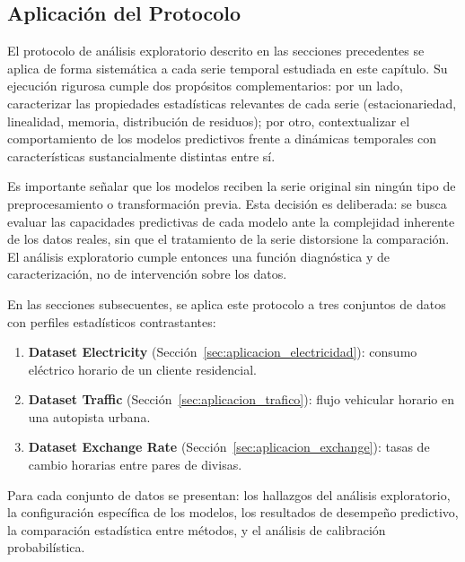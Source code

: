 \subsection{Aplicación del Protocolo}
\label{subsec:eda_aplicacion}

El protocolo de análisis exploratorio descrito en las secciones precedentes se aplica
de forma sistemática a cada serie temporal estudiada en este capítulo. Su ejecución
rigurosa cumple dos propósitos complementarios: por un lado, caracterizar las
propiedades estadísticas relevantes de cada serie (estacionariedad, linealidad,
memoria, distribución de residuos); por otro, contextualizar el comportamiento de
los modelos predictivos frente a dinámicas temporales con características
sustancialmente distintas entre sí.

Es importante señalar que los modelos reciben la serie original sin ningún tipo de
preprocesamiento o transformación previa. Esta decisión es deliberada: se busca
evaluar las capacidades predictivas de cada modelo ante la complejidad inherente
de los datos reales, sin que el tratamiento de la serie distorsione la comparación.
El análisis exploratorio cumple entonces una función diagnóstica y de caracterización,
no de intervención sobre los datos.

En las secciones subsecuentes, se aplica este protocolo a tres conjuntos de datos
con perfiles estadísticos contrastantes:

\begin{enumerate}
    \item \textbf{Dataset Electricity}
          (Sección~\ref{sec:aplicacion_electricidad}):
          consumo eléctrico horario de un cliente residencial.
    \item \textbf{Dataset Traffic}
          (Sección~\ref{sec:aplicacion_trafico}):
          flujo vehicular horario en una autopista urbana.
    \item \textbf{Dataset Exchange Rate}
          (Sección~\ref{sec:aplicacion_exchange}):
          tasas de cambio horarias entre pares de divisas.
\end{enumerate}

Para cada conjunto de datos se presentan: los hallazgos del análisis exploratorio,
la configuración específica de los modelos, los resultados de desempeño predictivo,
la comparación estadística entre métodos, y el análisis de calibración probabilística.


